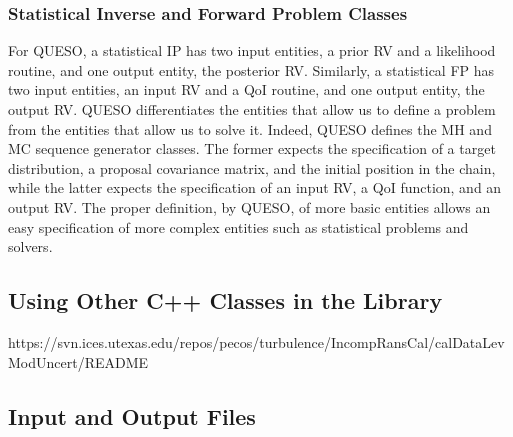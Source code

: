 \subsubsection{Statistical Inverse and Forward Problem Classes}
%
For QUESO, a statistical IP has two input entities, a prior RV and a likelihood routine, and one output entity, the posterior RV.
Similarly, a statistical FP has two input entities, an input RV and a QoI routine, and one output entity, the output RV.
QUESO differentiates the entities that allow us to define a problem from the entities that allow us to solve it.
Indeed, QUESO defines the MH and MC sequence generator classes.
The former expects the specification of a target distribution, a proposal covariance matrix, and the initial position in the chain,
while the latter expects the specification of an input RV, a QoI function, and an output RV.
The proper definition, by QUESO, of more basic entities allows an easy specification of more complex entities such as statistical problems and solvers.

% 


\subsection{Using Other C++ Classes in the Library}

https://svn.ices.utexas.edu/repos/pecos/turbulence/IncompRansCal/calDataLevModUncert/README


\subsection{Input and Output Files}

